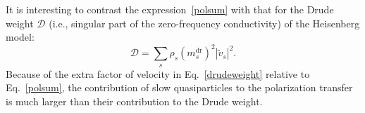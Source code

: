 \documentclass[
 reprint,
 superscriptaddress,
 amsmath,amssymb,
 aps,
 pra,
]{revtex4-2}
\begin{document}
It is interesting to contrast the expression~\eqref{polsum} with that for the Drude weight $\mathcal{D}$ (i.e., singular part of the zero-frequency conductivity) of the Heisenberg model:
%
\begin{equation}\label{drudeweight}
\mathcal{D} = \sum_s \rho_s (m_s^{\mathrm{dr}})^2 |\tilde v_s|^2.
\end{equation}
%
Because of the extra factor of velocity in Eq.~\eqref{drudeweight} relative to Eq.~\eqref{polsum}, the contribution of slow quasiparticles to the polarization transfer is much larger than their contribution to the Drude weight.
\end{document}
